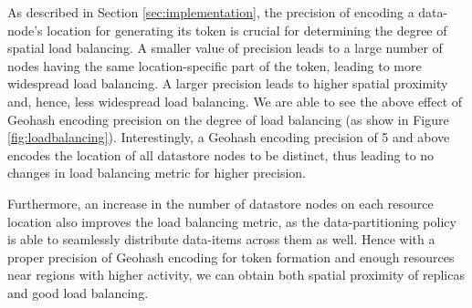 \par As described in Section \ref{sec:implementation}, the precision of encoding a data-node's location for generating its token is crucial for determining the degree of spatial load balancing. A smaller value of precision leads to a large number of nodes having the same location-specific part of the token, leading to more widespread load balancing. A larger precision leads to higher spatial proximity and, hence, less widespread load balancing. We are able to see the above effect of Geohash encoding precision on the degree of load balancing (as show in Figure \ref{fig:loadbalancing}). Interestingly, a Geohash encoding precision of 5 and above encodes the location of all datastore nodes to be distinct, thus leading to no changes in load balancing metric for higher precision. 
\par Furthermore, an increase in the number of datastore nodes on each resource location also improves the load balancing metric, as the data-partitioning policy is able to seamlessly distribute data-items across them as well.  Hence with a proper precision of Geohash encoding for token formation and enough resources near regions with higher activity, we can obtain both spatial proximity of replicas and good load balancing.

